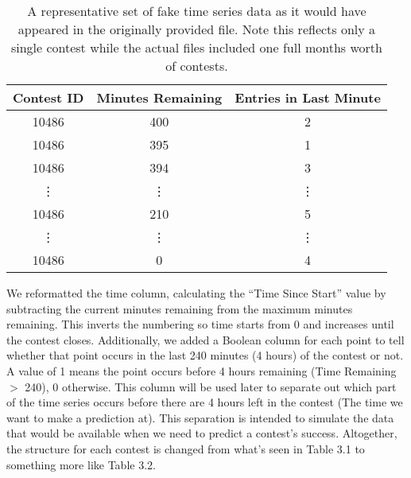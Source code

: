 \begin{table}
\begin{center}
\begin{tabular}{| c | c | c |}
\hline
 \textbf{Contest ID} & \textbf{Minutes Remaining} & \textbf{Entries in Last Minute} \\ 
 \hline
 10486 & 400 & 2 \\  
 \hline
 10486 & 395 & 1 \\
 \hline
 10486 & 394 & 3 \\
 \hline
 \vdots & \vdots & \vdots \\
 \hline
 10486 & 210 & 5 \\
 \hline
 \vdots & \vdots & \vdots \\
 \hline
 10486 & 0 & 4 \\
 \hline
\end{tabular}
\caption{A representative set of fake time series data as it would have appeared in the originally provided file. Note this reflects only a single contest while the actual files included one full months worth of contests.}
\end{center}
\end{table}

We reformatted the time column, calculating the ``Time Since Start'' value by subtracting the current minutes remaining from the maximum minutes remaining. This inverts the numbering so time starts from 0 and increases until the contest closes. 
Additionally, we added a Boolean column for each point to tell whether that point occurs in the last 240 minutes (4 hours) of the contest or not. A value of 1 means the point occurs before 4 hours remaining (Time Remaining $>$ 240), 0 otherwise. This column will be used later to  separate out which part of the time series occurs before there are 4 hours left in the contest (The time we want to make a prediction at). This separation is intended to simulate the data that would be available when we need to predict a contest's success.
Altogether, the structure for each contest is changed from what's seen in Table 3.1 to something more like Table 3.2.

